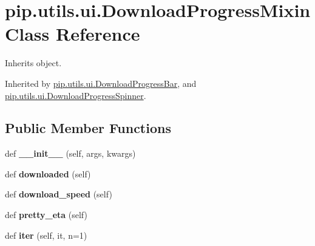 \hypertarget{classpip_1_1utils_1_1ui_1_1_download_progress_mixin}{}\section{pip.\+utils.\+ui.\+Download\+Progress\+Mixin Class Reference}
\label{classpip_1_1utils_1_1ui_1_1_download_progress_mixin}


Inherits object.



Inherited by \hyperlink{classpip_1_1utils_1_1ui_1_1_download_progress_bar}{pip.\+utils.\+ui.\+Download\+Progress\+Bar}, and \hyperlink{classpip_1_1utils_1_1ui_1_1_download_progress_spinner}{pip.\+utils.\+ui.\+Download\+Progress\+Spinner}.

\subsection*{Public Member Functions}
\begin{DoxyCompactItemize}
\item 
\mbox{\label{classpip_1_1utils_1_1ui_1_1_download_progress_mixin_ae67eff30f073d1d0bad5014f67003abc}} 
def {\bfseries \+\_\+\+\_\+init\+\_\+\+\_\+} (self, args, kwargs)
\item 
\mbox{\label{classpip_1_1utils_1_1ui_1_1_download_progress_mixin_a69d1f2f6e8f387997e7833ae6dc26e09}} 
def {\bfseries downloaded} (self)
\item 
\mbox{\label{classpip_1_1utils_1_1ui_1_1_download_progress_mixin_a4fefc7a054fa9447e2122047bf17e4ad}} 
def {\bfseries download\+\_\+speed} (self)
\item 
\mbox{\label{classpip_1_1utils_1_1ui_1_1_download_progress_mixin_a940dc7507ab7c9d042f3d77e87b79b5f}} 
def {\bfseries pretty\+\_\+eta} (self)
\item 
\mbox{\label{classpip_1_1utils_1_1ui_1_1_download_progress_mixin_ac18bfa913c731797bfd37a122abe76f2}} 
def {\bfseries iter} (self, it, n=1)
\end{DoxyCompactItemize}
